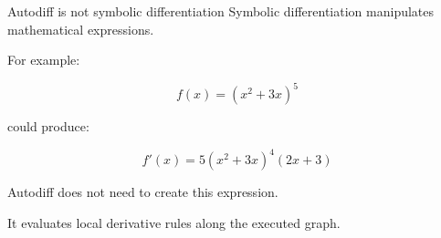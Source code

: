 \documentclass[10pt,aspectratio=169]{beamer}
\newcommand{\grad}[2]{\frac{\partial #1}{\partial #2}}
\newcommand{\adj}[1]{\bar{#1}}
\begin{document}
\begin{frame}[t]{Autodiff is not symbolic differentiation}
Symbolic differentiation manipulates mathematical expressions.

For example:

\[
f(x)=(x^2+3x)^5
\]

could produce:

\[
f'(x)=5(x^2+3x)^4(2x+3)
\]

Autodiff does not need to create this expression.

\vfill

It evaluates local derivative rules along the executed graph.
\end{frame}























\end{document}
